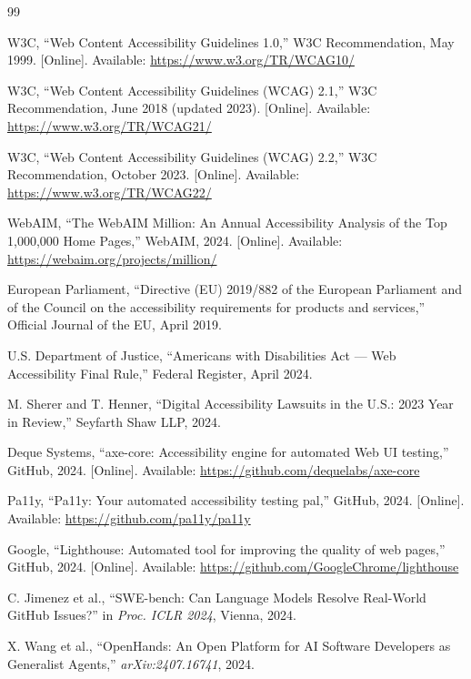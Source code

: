 \documentclass[10pt,conference]{IEEEtran}
\begin{document}

\begin{thebibliography}{99}

  W3C, ``Web Content Accessibility Guidelines 1.0,'' W3C Recommendation,
  May 1999. [Online]. Available: \url{https://www.w3.org/TR/WCAG10/}

  W3C, ``Web Content Accessibility Guidelines (WCAG) 2.1,'' W3C Recommendation,
  June 2018 (updated 2023). [Online]. Available: \url{https://www.w3.org/TR/WCAG21/}

  W3C, ``Web Content Accessibility Guidelines (WCAG) 2.2,'' W3C Recommendation,
  October 2023. [Online]. Available: \url{https://www.w3.org/TR/WCAG22/}

  WebAIM, ``The WebAIM Million: An Annual Accessibility Analysis of the Top 1,000,000
  Home Pages,'' WebAIM, 2024. [Online]. Available: \url{https://webaim.org/projects/million/}

  European Parliament, ``Directive (EU) 2019/882 of the European Parliament and of
  the Council on the accessibility requirements for products and services,''
  Official Journal of the EU, April 2019.

  U.S. Department of Justice, ``Americans with Disabilities Act — Web Accessibility
  Final Rule,'' Federal Register, April 2024.

  M. Sherer and T. Henner, ``Digital Accessibility Lawsuits in the U.S.:
  2023 Year in Review,'' Seyfarth Shaw LLP, 2024.

  Deque Systems, ``axe-core: Accessibility engine for automated Web UI testing,''
  GitHub, 2024. [Online]. Available: \url{https://github.com/dequelabs/axe-core}

  Pa11y, ``Pa11y: Your automated accessibility testing pal,''
  GitHub, 2024. [Online]. Available: \url{https://github.com/pa11y/pa11y}

  Google, ``Lighthouse: Automated tool for improving the quality of web pages,''
  GitHub, 2024. [Online]. Available:
  \url{https://github.com/GoogleChrome/lighthouse}

  C. Jimenez et al., ``SWE-bench: Can Language Models Resolve Real-World
  GitHub Issues?'' in \textit{Proc. ICLR 2024}, Vienna, 2024.

  X. Wang et al., ``OpenHands: An Open Platform for AI Software Developers
  as Generalist Agents,'' \textit{arXiv:2407.16741}, 2024.


\end{thebibliography}
\end{document}
